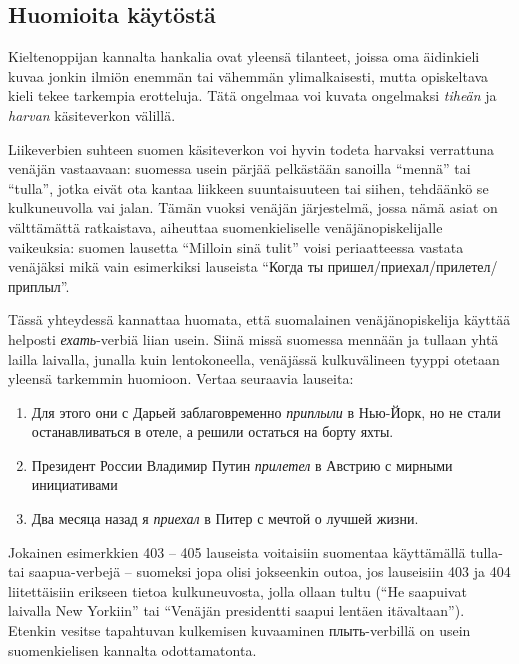 \documentclass[]{scrartcl}
\providecommand{\tightlist}{%
  \setlength{\itemsep}{0pt}\setlength{\parskip}{0pt}}
\begin{document}
\subsection{Huomioita käytöstä}\label{huomioita-kuxe4ytuxf6stuxe4}

Kieltenoppijan kannalta hankalia ovat yleensä tilanteet, joissa oma
äidinkieli kuvaa jonkin ilmiön enemmän tai vähemmän ylimalkaisesti,
mutta opiskeltava kieli tekee tarkempia erotteluja. Tätä ongelmaa voi
kuvata ongelmaksi \emph{tiheän} ja \emph{harvan} käsiteverkon välillä.

Liikeverbien suhteen suomen käsiteverkon voi hyvin todeta harvaksi
verrattuna venäjän vastaavaan: suomessa usein pärjää pelkästään sanoilla
``mennä'' tai ``tulla'', jotka eivät ota kantaa liikkeen suuntaisuuteen
tai siihen, tehdäänkö se kulkuneuvolla vai jalan. Tämän vuoksi venäjän
järjestelmä, jossa nämä asiat on välttämättä ratkaistava, aiheuttaa
suomenkieliselle venäjänopiskelijalle vaikeuksia: suomen lausetta
``Milloin sinä tulit'' voisi periaatteessa vastata venäjäksi mikä vain
esimerkiksi lauseista ``Когда ты пришел/приехал/прилетел/приплыл''.

Tässä yhteydessä kannattaa huomata, että suomalainen venäjänopiskelija
käyttää helposti \emph{ехать}-verbiä liian usein. Siinä missä suomessa
mennään ja tullaan yhtä lailla laivalla, junalla kuin lentokoneella,
venäjässä kulkuvälineen tyyppi otetaan yleensä tarkemmin huomioon.
Vertaa seuraavia lauseita:

\begin{enumerate}
\def\labelenumi{(\arabic{enumi})}
\setcounter{enumi}{402}
\tightlist
\item
  Для этого они с Дарьей заблаговременно \emph{приплыли} в Нью-Йорк, но
  не стали останавливаться в отеле, а решили остаться на борту яхты.
\item
  Президент России Владимир Путин \emph{прилетел} в Австрию с мирными
  инициативами
\item
  Два месяца назад я \emph{приехал} в Питер с мечтой о лучшей жизни.
\end{enumerate}

Jokainen esimerkkien 403 -- 405 lauseista voitaisiin suomentaa
käyttämällä tulla- tai saapua-verbejä -- suomeksi jopa olisi jokseenkin
outoa, jos lauseisiin 403 ja 404 liitettäisiin erikseen tietoa
kulkuneuvosta, jolla ollaan tultu (``He saapuivat laivalla New Yorkiin''
tai ``Venäjän presidentti saapui lentäen itävaltaan''). Etenkin vesitse
tapahtuvan kulkemisen kuvaaminen плыть-verbillä on usein suomenkielisen
kannalta odottamatonta.
\end{document}
